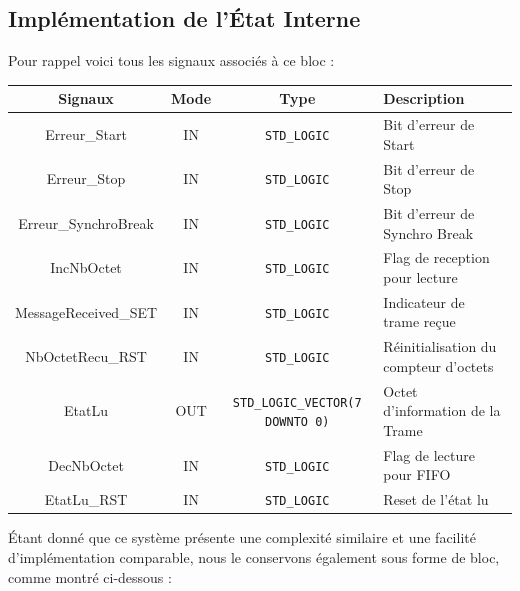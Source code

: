 \subsection{Implémentation de l'État Interne}

Pour rappel voici tous les signaux associés à ce bloc : 
\newline

\begin{center}
\renewcommand{\arraystretch}{1.2} %
\small %
    \begin{tabularx}{\textwidth}{|c||c|c|X|}
     \hline				
       \textbf{Signaux} & \textbf{Mode} & \textbf{Type} & \textbf{Description}  \\ \hline 
       Erreur\_Start & IN & \texttt{STD\_LOGIC} & Bit d'erreur de Start \\
       Erreur\_Stop & IN & \texttt{STD\_LOGIC} & Bit d'erreur de Stop\\
       Erreur\_SynchroBreak & IN & \texttt{STD\_LOGIC} & Bit d'erreur de Synchro Break\\
       IncNbOctet & IN & \texttt{STD\_LOGIC} & Flag de reception pour lecture \\
       MessageReceived\_SET & IN & \texttt{STD\_LOGIC} & Indicateur de trame reçue \\
       NbOctetRecu\_RST & IN & \texttt{STD\_LOGIC} & Réinitialisation du compteur d'octets \\
       EtatLu & OUT & \texttt{STD\_LOGIC\_VECTOR(7 DOWNTO 0)} & Octet d'information de la Trame \\
       DecNbOctet & IN & \texttt{STD\_LOGIC} & Flag de lecture pour FIFO \\
       EtatLu\_RST & IN & \texttt{STD\_LOGIC} & Reset de l'état lu \\
     \hline  
    \end{tabularx}
\end{center}

Étant donné que ce système présente une complexité similaire et une facilité d'implémentation comparable, nous le conservons également sous forme de bloc, comme montré ci-dessous : 
\newline

